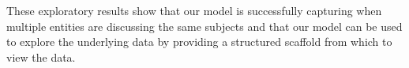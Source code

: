 These exploratory results show that our model is successfully capturing when multiple entities are discussing the same subjects and that our model can be used to explore the underlying data by providing a structured scaffold from which to view the data.




















